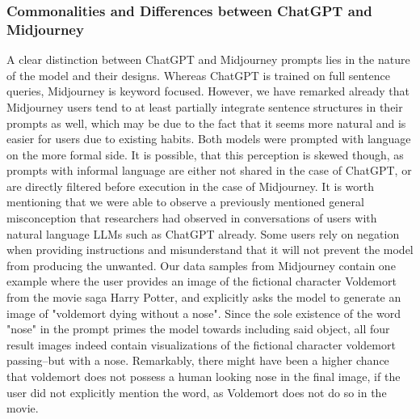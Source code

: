 \subsubsection{Commonalities and Differences between ChatGPT and Midjourney}
A clear distinction between ChatGPT and Midjourney prompts lies in the nature of the model and
their designs.
Whereas ChatGPT is trained on full sentence queries, Midjourney is keyword focused.
However, we have remarked already that Midjourney users tend to at least partially integrate
sentence structures in their prompts as well, which may be due to the fact that it seems more
natural and is easier for users due to existing habits.
Both models were prompted with language on the more formal side.
It is possible, that this perception is skewed though, as prompts with informal language are
either not shared in the case of ChatGPT, or are directly filtered before execution in the case
of Midjourney.
It is worth mentioning that we were able to observe a previously mentioned general misconception
that researchers had observed in conversations of users with natural language LLMs such as
ChatGPT already.
Some users rely on negation when providing instructions and misunderstand that it will not
prevent the model from producing the unwanted.
Our data samples from Midjourney contain one example where the user provides an image of the
fictional character Voldemort from the movie saga Harry Potter, and explicitly asks the model to
generate an image of "voldemort dying without a nose".
Since the sole existence of the word "nose" in the prompt primes the model towards including said
object, all four result images indeed contain visualizations of the fictional character voldemort
passing--but with a nose.
Remarkably, there might have been a higher chance that voldemort does not possess a human looking
nose in the final image, if the user did not explicitly mention the word, as Voldemort does not
do so in the movie.
